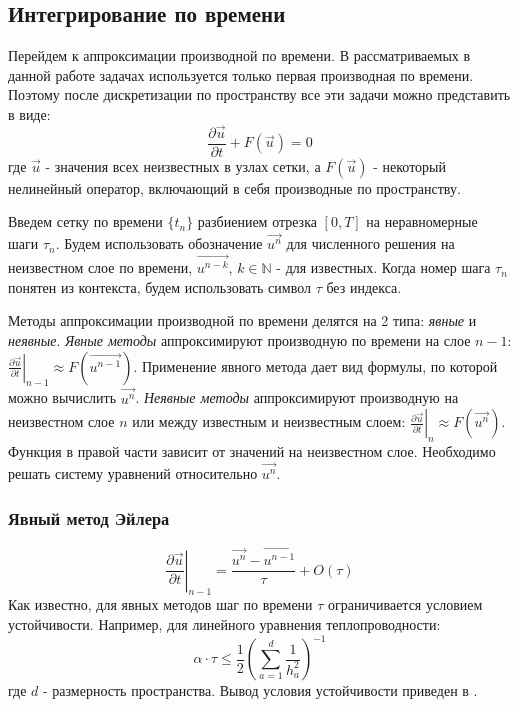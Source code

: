 \subsection{Интегрирование по времени \label{methods:time_integration}}
Перейдем к аппроксимации производной по времени. В рассматриваемых в данной работе задачах используется только первая производная по времени. Поэтому после дискретизации по пространству все эти задачи можно представить в виде:
\begin{equation} \label{eq:time_problem_general}
\frac{\partial \vec u}{\partial t} + F(\vec u) = 0
\end{equation}
где $\vec u$ - значения всех неизвестных в узлах сетки, а $F(\vec u)$ - некоторый нелинейный оператор, включающий в себя производные по пространству. 
\par
Введем сетку по времени $\{t_n\}$ разбиением отрезка $[0, T]$ на неравномерные шаги $\tau_n$. Будем использовать обозначение $\vec {u^n}$ для численного решения на неизвестном слое по времени, $\vec{u^{n - k}}$, $k \in \mathbb{N}$ - для известных. Когда номер шага $\tau_n$ понятен из контекста, будем использовать символ $\tau$ без индекса.
\par
Методы аппроксимации производной по времени делятся на 2 типа: \textit{явные} и \textit{неявные}. \textit{Явные методы} аппроксимируют производную по времени на слое $n - 1$:  $\left. \frac{\partial \vec u}{\partial t} \right \vert_{n-1} \approx F(\vec {u^{n-1}})$. Применение явного метода дает вид формулы, по которой можно вычислить $\vec{u^n}$. \textit{Неявные методы} аппроксимируют производную на неизвестном слое $n$ или между известным и неизвестным слоем: $\left. \frac{\partial \vec u}{\partial t} \right\vert_{n} \approx F(\vec {u^{n}})$. Функция в правой части зависит от значений на неизвестном слое. Необходимо решать систему уравнений относительно $\vec{u^n}$.
\subsubsection{Явный метод Эйлера}
\begin{equation}
\left. \frac{\partial \vec u}{\partial t} \right \vert_{n - 1} = \frac{\vec {u^n} - \vec {u^{n-1}}}{\tau} + O(\tau)
\end{equation}
Как известно, для явных методов шаг по времени  $\tau$ ограничивается условием устойчивости. Например, для линейного уравнения теплопроводности:
\begin{equation}
\alpha \cdot \tau \leq \frac{1}{2} \left( \sum_{a=1}^d \frac{1}{h_a^2}\right)^{-1}
\end{equation}
где $d$ - размерность пространства. Вывод условия устойчивости приведен в \cite{Samarskii}.
